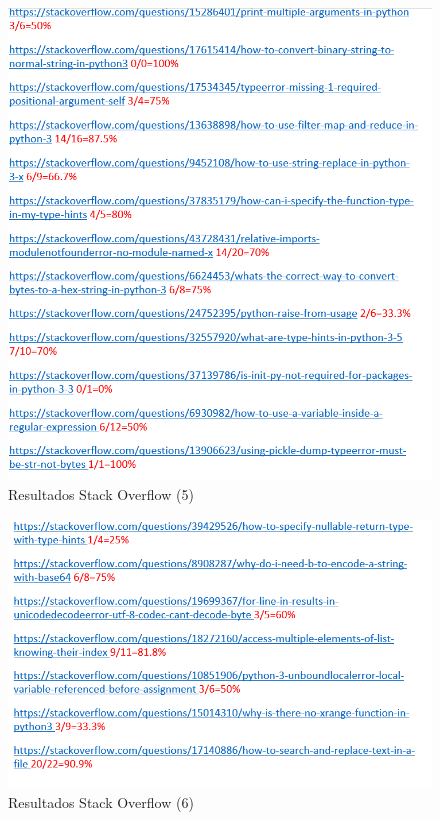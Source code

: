 \documentclass[a4paper, 12pt]{book}
\begin{document}
\begin{figure}
	\centering
    \includegraphics[width=1\textwidth]{img/stack9}
    \caption{Resultados Stack Overflow (5)}
 \end{figure}
 
\begin{figure}
	\centering
    \includegraphics[width=1\textwidth]{img/stack10}
    \caption{Resultados Stack Overflow (6)}
 \end{figure}
 
\end{document}
